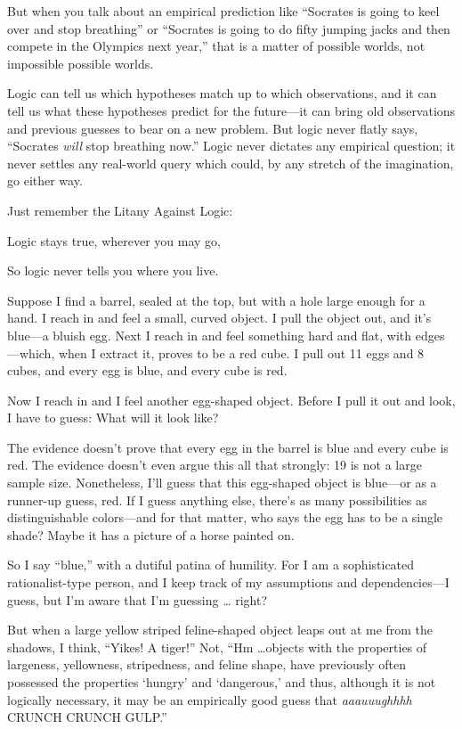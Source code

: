 {
 But when you talk about an empirical prediction like
``Socrates is going to keel over and stop
breathing'' or ``Socrates is going
to do fifty jumping jacks and then compete in the Olympics next
year,'' that is a matter of possible worlds, not
impossible possible worlds.}

{
 Logic can tell us which hypotheses match up to which observations,
and it can tell us what these hypotheses predict for the future---it
can bring old observations and previous guesses to bear on a new
problem. But logic never flatly says, ``Socrates
\textit{will} stop breathing now.'' Logic never
dictates any empirical question; it never settles any real-world query
which could, by any stretch of the imagination, go either way.}

{
 Just remember the Litany Against Logic:}

{
 Logic stays true, wherever you may go,}

{
 So logic never tells you where you live.}

\myendsectiontext


{
 Suppose I find a barrel, sealed at the top, but with a hole large
enough for a hand. I reach in and feel a small, curved object. I pull
the object out, and it's blue---a bluish egg. Next I
reach in and feel something hard and flat, with edges---which, when I
extract it, proves to be a red cube. I pull out 11 eggs and 8 cubes,
and every egg is blue, and every cube is red. }

{
 Now I reach in and I feel another egg-shaped object. Before I pull
it out and look, I have to guess: What will it look like?}

{
 The evidence doesn't prove that every egg in the
barrel is blue and every cube is red. The evidence
doesn't even argue this all that strongly: 19 is not a
large sample size. Nonetheless, I'll guess that this
egg-shaped object is blue---or as a runner-up guess, red. If I guess
anything else, there's as many possibilities as
distinguishable colors---and for that matter, who says the egg has to
be a single shade? Maybe it has a picture of a horse painted on.}

{
 So I say ``blue,'' with a
dutiful patina of humility. For I am a sophisticated rationalist-type
person, and I keep track of my assumptions and dependencies---I guess,
but I'm aware that I'm guessing \ldots
right?}

{
 But when a large yellow striped feline-shaped object leaps out at
me from the shadows, I think, ``Yikes! A
tiger!'' Not, ``Hm \ldots objects
with the properties of largeness, yellowness, stripedness, and feline
shape, have previously often possessed the properties
`hungry' and
`dangerous,' and thus, although it is
not logically necessary, it may be an empirically good guess that
\textit{aaauuughhhh} CRUNCH CRUNCH GULP.''}

